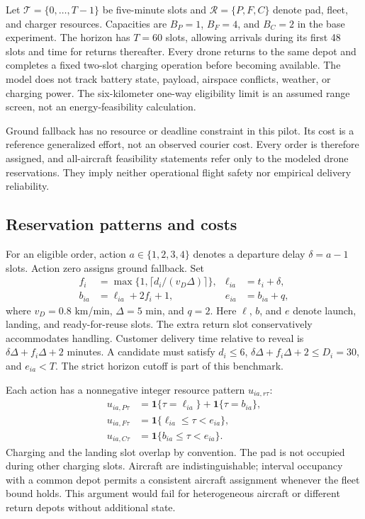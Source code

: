 \documentclass[11pt,a4paper]{article}
\begin{document}
Let $\mathcal T=\{0,\ldots,T-1\}$ be five-minute slots and $\mathcal R=\{P,F,C\}$ denote pad, fleet, and charger resources. Capacities are $B_P=1$, $B_F=4$, and $B_C=2$ in the base experiment. The horizon has $T=60$ slots, allowing arrivals during its first 48 slots and time for returns thereafter. Every drone returns to the same depot and completes a fixed two-slot charging operation before becoming available. The model does not track battery state, payload, airspace conflicts, weather, or charging power. The six-kilometer one-way eligibility limit is an assumed range screen, not an energy-feasibility calculation.

Ground fallback has no resource or deadline constraint in this pilot. Its cost is a reference generalized effort, not an observed courier cost. Every order is therefore assigned, and all-aircraft feasibility statements refer only to the modeled drone reservations. They imply neither operational flight safety nor empirical delivery reliability.

\subsection{Reservation patterns and costs}
For an eligible order, action $a\in\{1,2,3,4\}$ denotes a departure delay $\delta=a-1$ slots. Action zero assigns ground fallback. Set
\begin{align}
 f_i&=\max\{1,\lceil d_i/(v_D\Delta)\rceil\}, & \ell_{ia}&=t_i+\delta,\\
 b_{ia}&=\ell_{ia}+2f_i+1, & e_{ia}&=b_{ia}+q,
\end{align}
where $v_D=0.8$ km/min, $\Delta=5$ min, and $q=2$. Here $\ell$, $b$, and $e$ denote launch, landing, and ready-for-reuse slots. The extra return slot conservatively accommodates handling. Customer delivery time relative to reveal is $\delta\Delta+f_i\Delta+2$ minutes. A candidate must satisfy $d_i\leq6$, $\delta\Delta+f_i\Delta+2\leq D_i=30$, and $e_{ia}<T$. The strict horizon cutoff is part of this benchmark.

Each action has a nonnegative integer resource pattern $u_{ia,r\tau}$:
\begin{align}
u_{ia,P\tau}&=\mathbf1\{\tau=\ell_{ia}\}+\mathbf1\{\tau=b_{ia}\},\\
u_{ia,F\tau}&=\mathbf1\{\ell_{ia}\leq\tau<e_{ia}\},\\
u_{ia,C\tau}&=\mathbf1\{b_{ia}\leq\tau<e_{ia}\}.
\end{align}
Charging and the landing slot overlap by convention. The pad is not occupied during other charging slots. Aircraft are indistinguishable; interval occupancy with a common depot permits a consistent aircraft assignment whenever the fleet bound holds. This argument would fail for heterogeneous aircraft or different return depots without additional state.
\end{document}
